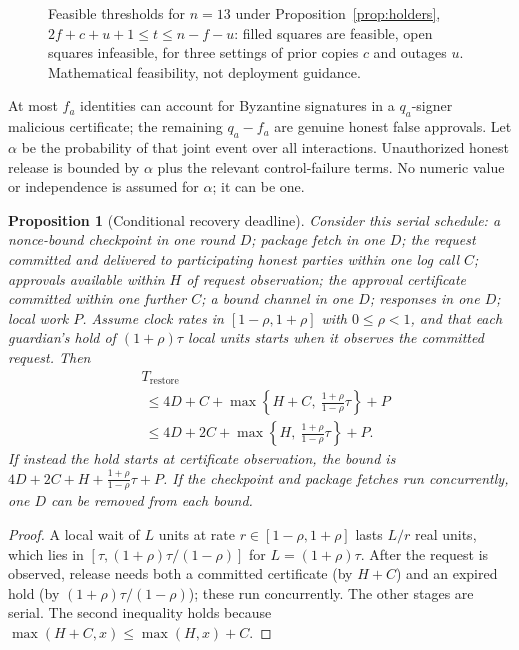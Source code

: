 \documentclass[pdflatex,sn-mathphys-num,twocolumn]{sn-jnl}
\theoremstyle{plain}
\newtheorem{proposition}[theorem]{Proposition}
\theoremstyle{definition}
\begin{document}
\begin{figure}[t]
\centering

\caption{Feasible thresholds for $n=13$ under Proposition~\ref{prop:holders}, $2f+c+u+1\le t\le n-f-u$: filled squares are feasible, open squares infeasible, for three settings of prior copies $c$ and outages $u$. Mathematical feasibility, not deployment guidance.}\label{fig:feasible}
\end{figure}



At most $f_a$ identities can account for Byzantine signatures in a $q_a$-signer malicious certificate; the remaining $q_a-f_a$ are genuine honest false approvals. Let $\alpha$ be the probability of that joint event over all interactions. Unauthorized honest release is bounded by $\alpha$ plus the relevant control-failure terms. No numeric value or independence is assumed for $\alpha$; it can be one.

\begin{proposition}[Conditional recovery deadline]\label{prop:deadline}
Consider this serial schedule: a nonce-bound checkpoint in one round $D$; package fetch in one $D$; the request committed and delivered to participating honest parties within one log call $C$; approvals available within $H$ of request observation; the approval certificate committed within one further $C$; a bound channel in one $D$; responses in one $D$; local work $P$. Assume clock rates in $[1-\rho,1+\rho]$ with $0\le\rho<1$, and that each guardian's hold of $(1+\rho)\tau$ local units starts when it observes the committed request. Then
\begin{equation}\label{eq:deadline}
\begin{split}
 &T_{\mathrm{restore}}\\
 &\ \le4D+C+\max\!\left\{H+C,\ \tfrac{1+\rho}{1-\rho}\tau\right\}+P\\
 &\ \le4D+2C+\max\!\left\{H,\ \tfrac{1+\rho}{1-\rho}\tau\right\}+P.
\end{split}
\end{equation}
If instead the hold starts at certificate observation, the bound is $4D+2C+H+\frac{1+\rho}{1-\rho}\tau+P$. If the checkpoint and package fetches run concurrently, one $D$ can be removed from each bound.
\end{proposition}
\begin{proof}
A local wait of $L$ units at rate $r\in[1-\rho,1+\rho]$ lasts $L/r$ real units, which lies in $[\tau,(1+\rho)\tau/(1-\rho)]$ for $L=(1+\rho)\tau$. After the request is observed, release needs both a committed certificate (by $H+C$) and an expired hold (by $(1+\rho)\tau/(1-\rho)$); these run concurrently. The other stages are serial. The second inequality holds because $\max(H+C,x)\le\max(H,x)+C$.
\end{proof}
\end{document}
